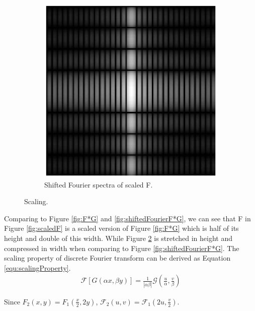 \documentclass[11pt,a4paper]{article}
\begin{document}
\begin{itemize}
\begin{figure}[!ht]
\begin{subfigure}[t]{.49\linewidth}
		\includegraphics[width=0.95\columnwidth]{Scaling_F_Shifted_Log_Fourier.eps}
		\caption{\scriptsize Shifted Fourier spectra of scaled F.}
		\label{fig:shiftedFourierScaledF}
		\end{subfigure}
		\caption{Scaling.}
	\end{figure}
	\par Comparing to Figure \ref{fig:F*G} and \ref{fig:shiftedFourierF*G}, we can see that F in Figure \ref{fig:scaledF} is a scaled version of Figure \ref{fig:F*G} which is half of its height and double of this width. While Figure \ref{fig:shiftedFourierScaledF} is stretched in height and compressed in width when comparing to Figure \ref{fig:shiftedFourierF*G}. The scaling property of discrete Fourier transform can be derived as Equation \ref{equ:scalingProperty}.
	\begin{align}
		\mathcal{F}[G(\alpha x, \beta y)] = \frac{1}{|\alpha\beta|}\mathcal{G}(\frac{u}{\alpha}, \frac{v}{\beta}) \label{equ:scalingProperty}
	\end{align}
	\par Since $F_{2}(x, y) = F_{1}(\frac{x}{2}, 2y)$, $\mathcal{F}_{2}(u, v) = \mathcal{F}_{1}(2u, \frac{v}{2})$.
\end{itemize}
\end{document}
